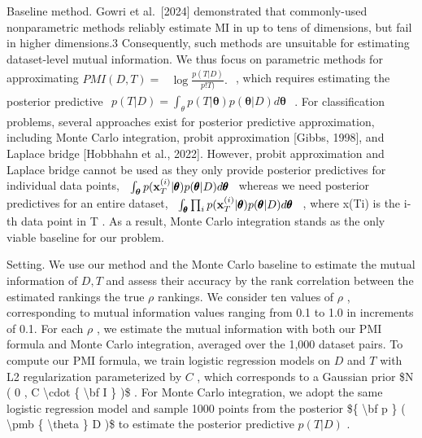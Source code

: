 Baseline method. Gowri et al.~{[}2024{]} demonstrated that commonly-used
nonparametric methods reliably estimate MI in up to tens of dimensions,
but fail in higher dimensions.3 Consequently, such methods are
unsuitable for estimating dataset-level mutual information. We thus
focus on parametric methods for approximating \(P M I ( D , T ) =\)
\(\begin{array} { r } { \log \frac { p ( T | D ) } { p ! T ) } . } \end{array}\)
, which requires estimating the posterior predictive
\(\begin{array} { r } { p ( T | D ) = \int _ { \theta } p ( T | \pmb \theta ) p ( \pmb \theta | D ) d \pmb \theta } \end{array}\)
. For classification problems, several approaches exist for posterior
predictive approximation, including Monte Carlo integration, probit
approximation {[}Gibbs, 1998{]}, and Laplace bridge {[}Hobbhahn et al.,
2022{]}. However, probit approximation and Laplace bridge cannot be used
as they only provide posterior predictives for individual data points,
\(\begin{array} { r l } { \int _ { \boldsymbol { \theta } } p ( \mathbf { x } _ { T } ^ { ( i ) } | \pmb { \theta } ) p ( \pmb { \theta } | D ) d \pmb { \theta } } \end{array}\)
whereas we need posterior predictives for an entire dataset,
\(\begin{array} { r l } { \int _ { \pmb { \theta } } \prod _ { i } p ( \mathbf { x } _ { T } ^ { ( i ) } | \pmb { \theta } ) p ( \pmb { \theta } | D ) d \pmb { \theta } } \end{array}\)
, where x(Ti) is the i-th data point in T . As a result, Monte Carlo
integration stands as the only viable baseline for our problem.

Setting. We use our method and the Monte Carlo baseline to estimate the
mutual information of \(D , T\) and assess their accuracy by the rank
correlation between the estimated rankings the true \(\rho\) rankings.
We consider ten values of \(\rho\) , corresponding to mutual information
values ranging from 0.1 to 1.0 in increments of 0.1. For each \(\rho\) ,
we estimate the mutual information with both our PMI formula and Monte
Carlo integration, averaged over the 1,000 dataset pairs. To compute our
PMI formula, we train logistic regression models on \(D\) and \(T\) with
L2 regularization parameterized by \(C\) , which corresponds to a
Gaussian prior {\$N ( 0 , C \textbackslash cdot \{ \textbackslash bf I
\} )\$} . For Monte Carlo integration, we adopt the same logistic
regression model and sample 1000 points from the posterior {\$\{
\textbackslash bf p \} ( \textbackslash pmb \{ \textbackslash theta \}
\textbar{} D )\$} to estimate the posterior predictive \(p ( T | D )\) .

